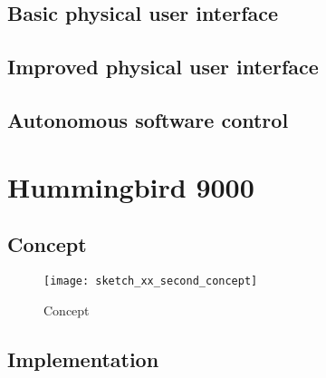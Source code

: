 
\subsection{Basic physical user interface}

\subsection{Improved physical user interface}


\subsection{Autonomous software control}
% 


\section{Hummingbird 9000}

\subsection{Concept}



\begin{figure}[h]
\centering

\texttt{[image: sketch\_xx\_second\_concept]}

\caption{Concept}
\end{figure}

\subsection{Implementation}